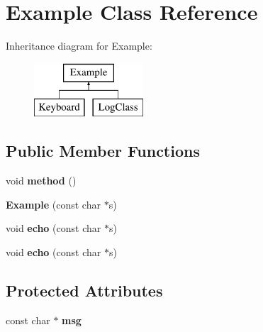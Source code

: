 \hypertarget{classExample}{}\section{Example Class Reference}
\label{classExample}
Inheritance diagram for Example\+:\begin{figure}[H]
\begin{center}
\leavevmode
\includegraphics[height=2.000000cm]{classExample}
\end{center}
\end{figure}
\subsection*{Public Member Functions}
\begin{DoxyCompactItemize}
\item 
\hypertarget{classExample_a067116705f9fdae3a5b4a9ea98fcec34}{}void {\bfseries method} ()\label{classExample_a067116705f9fdae3a5b4a9ea98fcec34}

\item 
\hypertarget{classExample_a3c7a3d20e917aa91ba195c18405c86c2}{}{\bfseries Example} (const char $\ast$s)\label{classExample_a3c7a3d20e917aa91ba195c18405c86c2}

\item 
\hypertarget{classExample_a0ac74109c6aa05c5fb8cfe30199fea5a}{}void {\bfseries echo} (const char $\ast$s)\label{classExample_a0ac74109c6aa05c5fb8cfe30199fea5a}

\item 
\hypertarget{classExample_a0ac74109c6aa05c5fb8cfe30199fea5a}{}void {\bfseries echo} (const char $\ast$s)\label{classExample_a0ac74109c6aa05c5fb8cfe30199fea5a}

\end{DoxyCompactItemize}
\subsection*{Protected Attributes}
\begin{DoxyCompactItemize}
\item 
\hypertarget{classExample_a0fddb3390b417f1c0a980c6ef7aab4d5}{}const char $\ast$ {\bfseries msg}\label{classExample_a0fddb3390b417f1c0a980c6ef7aab4d5}

\end{DoxyCompactItemize}


